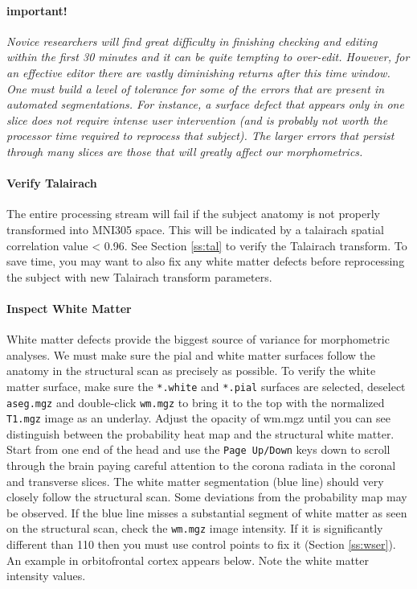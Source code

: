 \documentclass[paper=a4, fontsize=11pt]{scrartcl} %
\numberwithin{equation}{section} %
\numberwithin{figure}{section} %
\numberwithin{table}{section} %
\begin{document}
\paragraph{important!} \textit{Novice researchers will find great difficulty in finishing checking and editing within the first 30 minutes and it can be quite tempting to over-edit.  However, for an effective editor there are vastly diminishing returns after this time window.  One must build a level of tolerance for some of the errors that are present in automated segmentations.  For instance, a surface defect that appears only in one slice does not require intense user intervention (and is probably not worth the processor time required to reprocess that subject).  The larger errors that persist through many slices are those that will greatly affect our morphometrics.}

\paragraph{Verify Talairach}  The entire processing stream will fail if the subject anatomy is not properly transformed into MNI305 space. This will be indicated by a talairach spatial correlation value < 0.96. See Section \ref{ss:tal} to verify the Talairach transform.  To save time, you may want to also fix any white matter defects before reprocessing the subject with new Talairach transform parameters.

\paragraph{Inspect White Matter} White matter defects provide the biggest source of variance for morphometric analyses.  We must make sure the pial and white matter surfaces follow the anatomy in the structural scan as precisely as possible. To verify the white matter surface, make sure the \texttt{*.white} and \texttt{*.pial} surfaces are selected, deselect \texttt{aseg.mgz} and double-click \texttt{wm.mgz} to bring it to the top with the normalized \texttt{T1.mgz} image as an underlay.  Adjust the opacity of wm.mgz until you can see distinguish between the probability heat map and the structural white matter.  Start from one end of the head and use the \texttt{Page Up/Down} keys down to scroll through the brain paying careful attention to the corona radiata in the coronal and transverse slices.  The white matter segmentation (blue line) should very closely follow the structural scan.  Some deviations from the probability map may be observed.  If the blue line misses a substantial segment of white matter as seen on the structural scan, check the \texttt{wm.mgz} image intensity.  If it is significantly different than 110 then you must use control points to fix it (Section \ref{ss:wser}).  An example in orbitofrontal cortex appears below.  Note the white matter intensity values. \\ 
\end{document}
